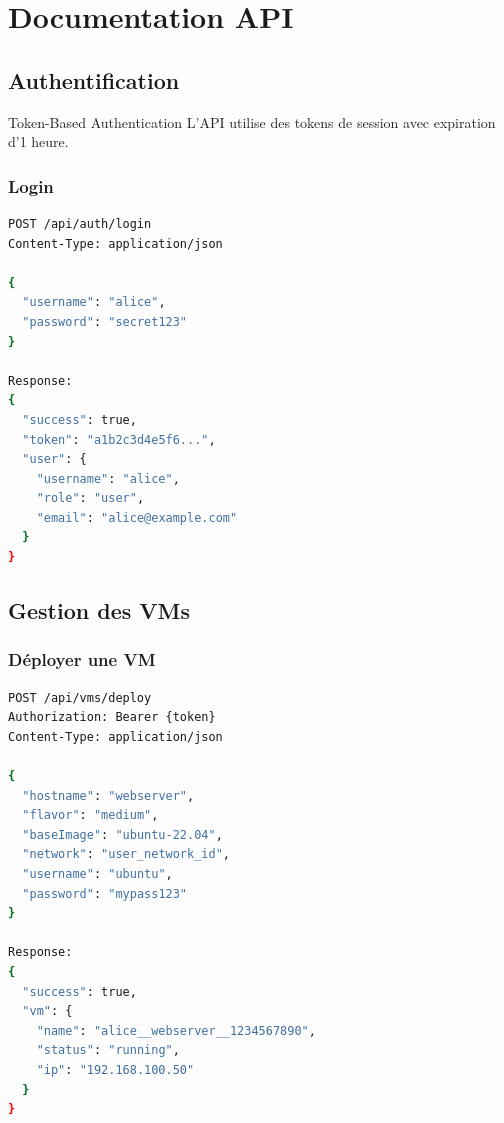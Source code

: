 \documentclass[12pt,a4paper]{article}
\begin{document}
\section{Documentation API}

\subsection{Authentification}

\begin{infobox}{Token-Based Authentication}
L'API utilise des tokens de session avec expiration d'1 heure.
\end{infobox}

\subsubsection{Login}

\begin{lstlisting}[language=bash, caption=Endpoint de connexion]
POST /api/auth/login
Content-Type: application/json

{
  "username": "alice",
  "password": "secret123"
}

Response:
{
  "success": true,
  "token": "a1b2c3d4e5f6...",
  "user": {
    "username": "alice",
    "role": "user",
    "email": "alice@example.com"
  }
}
\end{lstlisting}

\subsection{Gestion des VMs}

\subsubsection{Déployer une VM}

\begin{lstlisting}[language=bash, caption=Création de VM]
POST /api/vms/deploy
Authorization: Bearer {token}
Content-Type: application/json

{
  "hostname": "webserver",
  "flavor": "medium",
  "baseImage": "ubuntu-22.04",
  "network": "user_network_id",
  "username": "ubuntu",
  "password": "mypass123"
}

Response:
{
  "success": true,
  "vm": {
    "name": "alice__webserver__1234567890",
    "status": "running",
    "ip": "192.168.100.50"
  }
}
\end{lstlisting}
\end{document}
